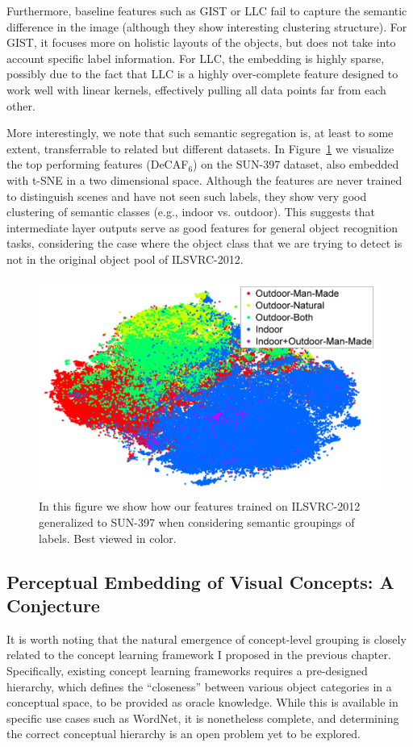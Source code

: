 Furthermore, baseline features such as GIST or LLC fail to capture the semantic difference in the image (although they show interesting clustering structure). For GIST, it focuses more on holistic layouts of the objects, but does not take into account specific label information. For LLC, the embedding is highly sparse, possibly due to the fact that LLC is a highly over-complete feature designed to work well with linear kernels, effectively pulling all data points far from each other.


More interestingly, we note that such semantic segregation is, at least to some extent, transferrable to related but different datasets. In Figure~\ref{fig:generalization} we visualize the top performing features (DeCAF$_6$) on the SUN-397 dataset, also embedded with t-SNE in a two dimensional space. Although the features are never trained to distinguish scenes and have not seen such labels, they show very good clustering of semantic classes (e.g., indoor vs. outdoor). This suggests that intermediate layer outputs serve as good features for general object recognition tasks, considering the case where the object class that we are trying to detect is not in the original object pool of ILSVRC-2012.

\begin{figure}
\centering
\includegraphics[width=.6\linewidth]{figs/decaf/SUN397_quarter-fs8.png}
\caption{In this figure we show how our features trained on ILSVRC-2012 generalized to SUN-397 when considering semantic groupings of labels. Best viewed in color. \label{fig:generalization}}
\end{figure}

\subsection{Perceptual Embedding of Visual Concepts: A Conjecture}

It is worth noting that the natural emergence of concept-level grouping is closely related to the concept learning framework I proposed in the previous chapter. Specifically, existing concept learning frameworks requires a pre-designed hierarchy, which defines the ``closeness'' between various object categories in a conceptual space, to be provided as oracle knowledge. While this is available in specific use cases such as WordNet, it is nonetheless complete, and determining the correct conceptual hierarchy is an open problem yet to be explored.

